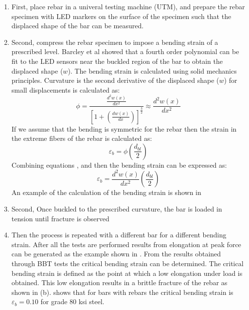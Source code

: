 \begin{enumerate}
    \item First, place rebar in a univeral testing machine (UTM), and prepare the rebar specimen with LED markers on the surface of the specimen such that the displaced shape of the bar can be measured.
    \item Second, compress the rebar specimen to impose a bending strain of a prescribed level. Barcley et al showed that a fourth order polynomial can be fit to the LED sensors near the buckled region of the bar to obtain the displaced shape ($w$). The bending strain is calculated using solid mechanics principles. Curvature is the second derivative of the displaced shape ($w$) for small displacements is calculated as: 
    \begin{equation}
        \phi=\frac{\frac{d^2w(x)}{dx^2}}{\left[1+\left(\frac{dw(x)}{dx}\right)\right]^\frac{3}{2}}\approx \frac{d^2w(x)}{dx^2}
        \label{eq.CuvatureAprox}
    \end{equation}
    If we assume that the bending is symmetric for the rebar then the strain in the extreme fibers of the rebar is calculated as:
    \begin{equation}
        \varepsilon_{b}=\phi\left(\frac{d_{bl}}{2}\right) 
        \label{eq.BendingStrain}
    \end{equation}    
    Combining equations , and  then the bending strain can be expressed as:
    \begin{equation}
        \varepsilon_{b}=\frac{d^2w(x)}{dx^2}\left(\frac{d_{bl}}{2}\right) 
        \label{eq.BendingStrainExpanded}
    \end{equation}
    An example of the calculation of the bending strain is shown in 
    \item Second, Once buckled to the prescribed curvature, the bar is loaded in tension until fracture is observed
    \item Then the process is repeated with a different bar for a different bending strain. After all the tests are performed results from elongation at peak force can be generated as the example shown in . From the results obtained through BBT tests the critical bending strain can be determined. The critical bending strain is defined as the point at which a low elongation under load is obtained. This low elongation results in a brittle fracture of the rebar as shown in (b).  shows that for bars with rebars the critical bending strain is $\varepsilon_{b}=0.10$ for grade 80 ksi steel.
\end{enumerate}

